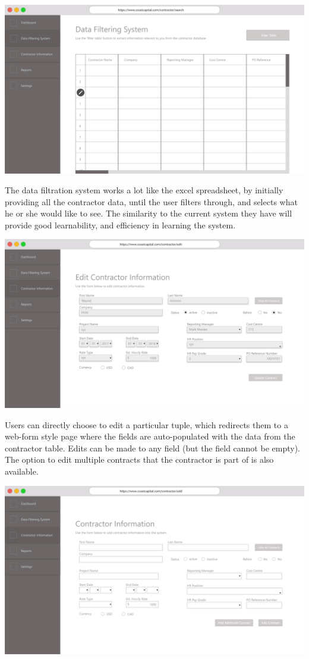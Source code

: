 \documentclass[11pt, titlepage]{article}
\begin{document}
\includegraphics[width=1.0\textwidth]{"../design/Filter Data"}

The data filtration system works a lot like the excel spreadsheet, by initially providing all the contractor data, until the user filters through, and selects what he or she would like to see. The similarity to the current system they have will provide good learnability, and efficiency in learning the system. 

\includegraphics[width=1.0\textwidth]{"../design/Edit Contractor"}

Users can directly choose to edit a particular tuple, which redirects them to a web-form style page where the fields are auto-populated with the data from the contractor table. Edits can be made to any field (but the field cannot be empty). The option to edit multiple contracts that the contractor is part of is also available. 

\includegraphics[width=1.0\textwidth]{"../design/Add Contractor"}
\end{document}
